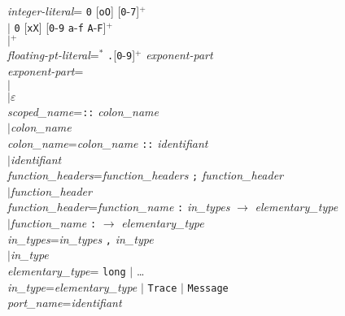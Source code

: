 \begin{tabbing}
\emph{integer-literal}\>\twocol=\> \texttt{0} [\texttt{oO}] [\texttt{0}-\texttt{7}]$^+$ \\
    \>$\mid$\>  \texttt{0} [\texttt{xX}] [\texttt{0}-\texttt{9} \texttt{a}-\texttt{f} \texttt{A}-\texttt{F}]$^+$ \\ 
    \>$\mid$$^+$ \\ 

\emph{floating-pt-literal}\>\twocol=$^*$ \texttt{.}[\texttt{0}-\texttt{9}]$^+$
\emph{exponent-part} \\
\emph{exponent-part}\>\twocol= \\
    \>$\mid$ \\
\>$\mid$\>$\varepsilon$ \\ 

\emph{scoped\_name}\>\twocol=\>\verb+::+ \emph{colon\_name}\\
 \>$\mid$\>\emph{colon\_name}\\

\emph{colon\_name}\>\twocol=\>\emph{colon\_name} \verb+::+ \emph{identifiant}\\
 \>$\mid$\>\emph{identifiant}\\


\emph{function\_headers}\>\twocol=\>\emph{function\_headers}
\texttt{;} \emph{function\_header}  \\
\>$\mid$\>\emph{function\_header}  \\

\emph{function\_header}\>\twocol=\>\emph{function\_name} \texttt{:} \emph{in\_types}
\texttt{$\rightarrow$} \emph{elementary\_type}\\

\>$\mid$\>\emph{function\_name} \texttt{:} \texttt{$\rightarrow$} \emph{elementary\_type}\\

\emph{in\_types}\>\twocol=\>\emph{in\_types} \texttt{,} \emph{in\_type}\\
\>$\mid$\>\emph{in\_type}\\

\emph{elementary\_type}\>\twocol=\> \texttt{long} $\mid$ \dots\\

\emph{in\_type}\>\twocol=\>\emph{elementary\_type} $\mid$
\texttt{Trace} $\mid$ \texttt{Message}\\

\emph{port\_name}\>\twocol=\>\emph{identifiant}\\


\end{tabbing}
